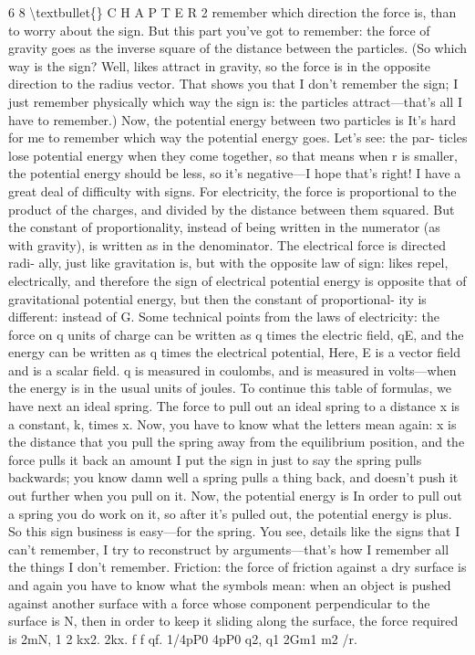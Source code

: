 \documentclass[10pt,oneside]{article}
\begin{document}
6 8 \textbackslash{}textbullet\{\} C H A P T E R  2 remember which direction the force is, than to worry about the sign. But this part you’ve got to remember: the force of gravity goes as the inverse square of the distance between the particles. (So which way is the sign? Well, likes attract in gravity, so the force is in the opposite direction to the radius vector. That shows you that I don’t remember the sign; I just remember physically which way the sign is: the particles attract---that’s all I have to remember.) Now, the potential energy between two particles is It’s hard for me to remember which way the potential energy goes. Let’s see: the par- ticles lose potential energy when they come together, so that means when r is smaller, the potential energy should be less, so it’s negative---I hope that’s right! I have a great deal of difficulty with signs. For electricity, the force is proportional to the product of the charges, and divided by the distance between them squared. But the constant of proportionality, instead of being written in the numerator (as with gravity), is written as in the denominator. The electrical force is directed radi- ally, just like gravitation is, but with the opposite law of sign: likes repel, electrically, and therefore the sign of electrical potential energy is opposite that of gravitational potential energy, but then the constant of proportional- ity is different: instead of G. Some technical points from the laws of electricity: the force on q units of charge can be written as q times the electric field, qE, and the energy can be written as q times the electrical potential, Here, E is a vector field and is a scalar field. q is measured in coulombs, and is measured in volts---when the energy is in the usual units of joules. To continue this table of formulas, we have next an ideal spring. The force to pull out an ideal spring to a distance x is a constant, k, times x. Now, you have to know what the letters mean again: x is the distance that you pull the spring away from the equilibrium position, and the force pulls it back an amount I put the sign in just to say the spring pulls backwards; you know damn well a spring pulls a thing back, and doesn’t push it out further when you pull on it. Now, the potential energy is In order to pull out a spring you do work on it, so after it’s pulled out, the potential energy is plus. So this sign business is easy---for the spring. You see, details like the signs that I can’t remember, I try to reconstruct by arguments---that’s how I remember all the things I don’t remember. Friction: the force of friction against a dry surface is and again you have to know what the symbols mean: when an object is pushed against another surface with a force whose component perpendicular to the surface is N, then in order to keep it sliding along the surface, the force required is 2mN, 1 2 kx2. 2kx. f f qf. 1/4pP0 4pP0 q2, q1 2Gm1 m2 /r.\par
\end{document}
